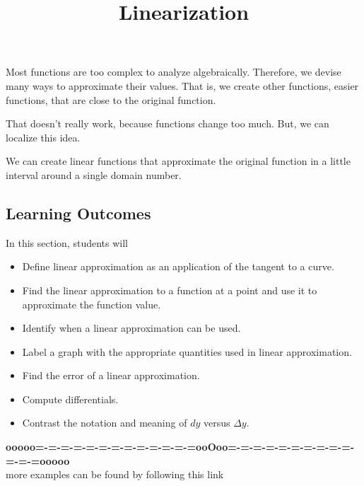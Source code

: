 \documentclass{ximera}
\title{Linearization}
\begin{document}
\begin{abstract}
\end{abstract}
\maketitle







Most functions are too complex to analyze algebraically. Therefore, we devise many ways to approximate their values. That is, we create other functions, easier functions, that are close to the original function.

That doesn't really work, because functions change too much.  But, we can localize this idea.

We can create linear functions that approximate the original function in a little interval around a single domain number.











\subsection{Learning Outcomes}


\begin{sectionOutcomes}
In this section, students will 

\begin{itemize}
\item Define linear approximation as an application of the tangent to a curve.
\item Find the linear approximation to a function at a point and use it to approximate the function value.
\item Identify when a linear approximation can be used.
\item Label a graph with the appropriate quantities used in linear approximation.
\item Find the error of a linear approximation.
\item Compute differentials.
\item Contrast the notation and meaning of $dy$ versus $\Delta y$.
\end{itemize}
\end{sectionOutcomes}









\begin{center}
\textbf{\textcolor{green!50!black}{ooooo=-=-=-=-=-=-=-=-=-=-=-=-=ooOoo=-=-=-=-=-=-=-=-=-=-=-=-=ooooo}} \\

more examples can be found by following this link\\ 

\end{center}
\end{document}
